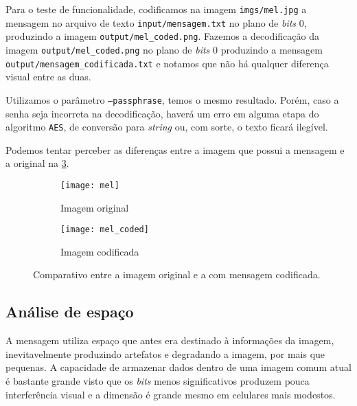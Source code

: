 \documentclass[brazilian,a4paper,twocolumn]{article}
\begin{document}
        Para o teste de funcionalidade, codificamos na imagem \texttt{imgs/mel.jpg} a mensagem no arquivo de texto \texttt{input/mensagem.txt} no plano de \textit{bits} 0, produzindo a imagem \texttt{output/mel_coded.png}. Fazemos a decodificação da imagem \texttt{output/mel_coded.png} no plano de \textit{bits} 0 produzindo a mensagem \texttt{output/mensagem_codificada.txt} e notamos que não há qualquer diferença visual entre as duas.

        Utilizamos o parâmetro \texttt{---passphrase}, temos o mesmo resultado. Porém, caso a senha seja incorreta na decodificação, haverá um erro em alguma etapa do algoritmo \texttt{AES}, de conversão para \textit{string} ou, com sorte, o texto ficará ilegível.

        Podemos tentar perceber as diferenças entre a imagem que possui a mensagem e a original na \cref{fig:mel-comparativo}.

        \begin{figure}[h]
            \centering
            \begin{subfigure}{0.23\textwidth}
                \texttt{[image: mel]}
                \caption{Imagem original}
                \label{fig:mel-original}
            \end{subfigure}
            \hfill
            \begin{subfigure}{0.23\textwidth}
                \texttt{[image: mel\_coded]}
                \caption{Imagem codificada}
                \label{fig:mel-coded}
            \end{subfigure}

            \caption{Comparativo entre a imagem original e a com mensagem codificada.}
            \label{fig:mel-comparativo}
        \end{figure}

    \subsection{Análise de espaço}
    \label{sec:espaco-utilizado}

        A mensagem utiliza espaço que antes era destinado à informações da imagem, inevitavelmente produzindo artefatos e degradando a imagem, por mais que pequenas. A capacidade de armazenar dados dentro de uma imagem comum atual é bastante grande visto que os \textit{bits} menos significativos produzem pouca interferência visual e a dimensão é grande mesmo em celulares mais modestos.
\end{document}
